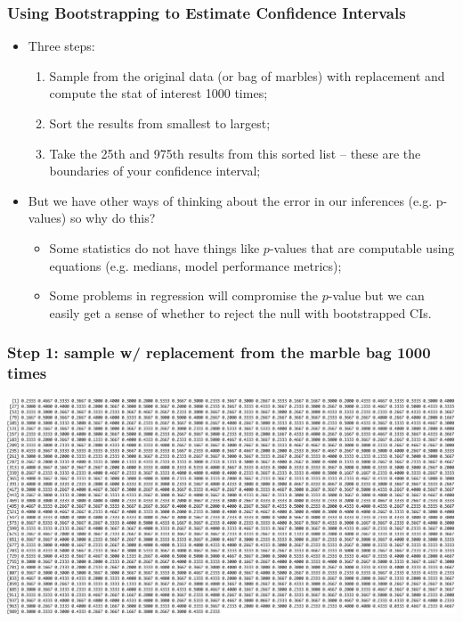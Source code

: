 \documentclass[aspectratio=169]{beamer}
\theoremstyle{principle}
\begin{document}
\begin{frame}
\frametitle{Using Bootstrapping to Estimate Confidence Intervals}

\begin{itemize}
\item Three steps:
\begin{enumerate}
\item Sample from the original data (or bag of marbles) with replacement and compute the stat of interest 1000 times;
\item Sort the results from smallest to largest; 
\item Take the 25th and 975th results from this sorted list -- these are the boundaries of your confidence interval;
\end{enumerate}
\bigskip

\item But we have other ways of thinking about the error in our inferences (e.g. p-values) so why do this?
\begin{itemize}
\item Some statistics do not have things like $p$-values that are computable using equations (e.g. medians, model performance metrics);
\item Some problems in regression will compromise the $p$-value but we can easily get a sense of whether to reject the null with bootstrapped CIs.
\end{itemize}
\end{itemize}

\end{frame}

\begin{frame}
\frametitle{Step 1: sample w/ replacement from the marble bag 1000 times}

\begin{center}
\includegraphics[scale=0.33]{numbers.png}
\end{center}

\end{frame}
\end{document}
